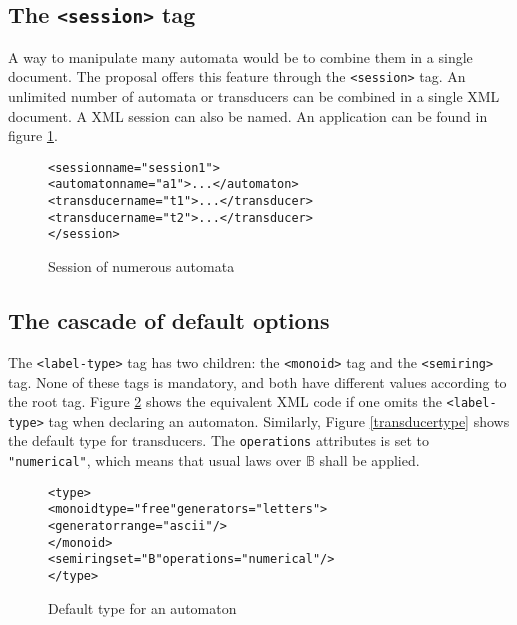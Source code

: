 \documentclass[a4paper]{llncs}
\def\typetag{\texttt{<label-type>}}
\def\sessiontag{\texttt{<session>}}
\def\monoidtag{\texttt{<monoid>}}
\def\semiringtag{\texttt{<semiring>}}
\begin{document}
\subsection{The \sessiontag{} tag}

A way to manipulate many automata would be to combine them in
a single document. The proposal offers this feature through the
\sessiontag{} tag. An unlimited number of automata or transducers
can be combined in a single XML document. A XML session can also be named.
An application can be found in figure \ref{session1}.

{\small

\begin{figure}[h]
  \begin{center}
\begin{alltt}
<session name="session1">
  <automaton name="a1">...</automaton>
  <transducer name="t1">...</transducer>
  <transducer name="t2">...</transducer>
</session>
\end{alltt}

\caption{Session of numerous automata}
\label{session1}
  \end{center}
\end{figure}
}

\subsection{The cascade of default options}

The \typetag{} tag has two children: the \monoidtag{} tag and
the \semiringtag{} tag. None of these tags is mandatory, and both have
different values according to the root tag. Figure
\ref{automatontype} shows the equivalent XML code if one omits the
\typetag{} tag when declaring an automaton. Similarly,
Figure \ref{transducertype} shows the default type for transducers.
The \texttt{operations} attributes is set to \verb|"numerical"|,
which means that usual laws over $\mathbb{B}$ shall be applied.

\begin{figure}[h]
  \begin{center}
\begin{alltt}
<type>
  <monoid type="free" generators="letters">
     <generator range="ascii"/>
  </monoid>
  <semiring set="B" operations="numerical"/>
</type>
\end{alltt}

\caption{Default type for an automaton}
\label{automatontype}
  \end{center}
\end{figure}
\end{document}
